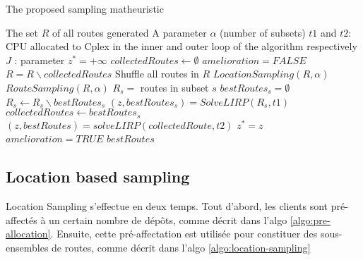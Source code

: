 \documentclass[10pt, a4paper]{article}
\begin{document}
\begin{algorithm}
	\caption{The proposed sampling matheuristic}
	\label{mainalgo}
	\begin{algorithmic}[1]
		\REQUIRE  The set $R$ of all routes generated
		\REQUIRE A parameter $\alpha$ (number of subsets)
		\REQUIRE $t1$ and $t2$: CPU allocated to Cplex in the inner and outer loop of the algorithm respectively
		\REQUIRE $J$ : parameter
		\STATE $z^*= +\infty$
		\STATE $collectedRoutes \leftarrow \emptyset$
		\REPEAT
			\STATE $amelioration = FALSE$
			\STATE $R =  R \backslash collectedRoutes$
			\STATE Shuffle all routes in $R$
			\STATE $LocationSampling(R,\alpha)$ 
			\STATE $RouteSampling(R,\alpha)$	
				\STATE $R_s = $ routes in subset $s$
				\STATE $bestRoutes_s = \emptyset$
					\STATE $R_s \leftarrow R_s \backslash bestRoutes_s$ 
					\STATE $(z,bestRoutes_s) = SolveLIRP(R_s,t1)$ 
					\STATE $collectedRoutes \leftarrow bestRoutes_s$
				\ENDFOR
			\ENDFOR
			\STATE 	$(z,bestRoutes) = solveLIRP(collectedRoute, t2)$
				\STATE $z^*=z$
				\STATE $amelioration =TRUE$
			\ENDIF
		\RETURN $bestRoutes$
	\end{algorithmic}
\end{algorithm}


\subsection{Location based sampling}

Location Sampling s'effectue en deux temps. 
Tout d'abord, les clients sont pré-affectés à un certain nombre de dépôts, comme décrit dans l'algo \ref{algo:pre-allocation}.
Ensuite, cette pré-affectation est utilisée pour constituer des sous-ensembles de routes, comme décrit dans l'algo 	\ref{algo:location-sampling}
\end{document}
